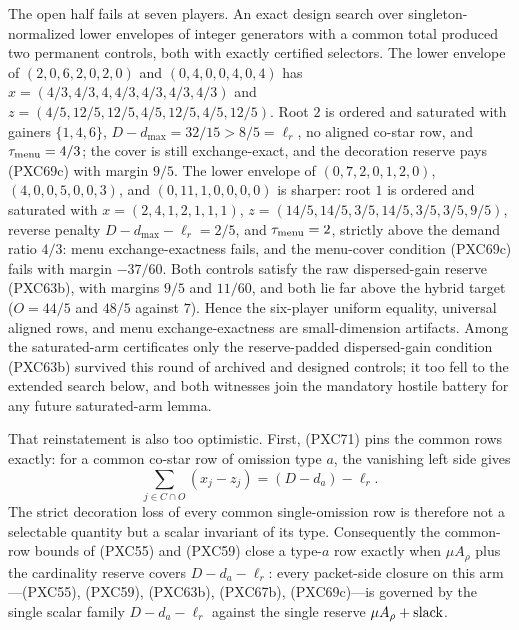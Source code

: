 \documentclass[11pt]{article}
\begin{document}
The open half fails at seven players.  An exact design search over
singleton-normalized lower envelopes of integer generators with a common
total produced two permanent controls, both with exactly certified
selectors.  The lower envelope of $(2,0,6,2,0,2,0)$ and $(0,4,0,0,4,0,4)$
has $x=(4/3,4/3,4,4/3,4/3,4/3,4/3)$ and
$z=(4/5,12/5,12/5,4/5,12/5,4/5,12/5)$.  Root $2$ is ordered and saturated
with gainers $\{1,4,6\}$, $D-d_{\max}=32/15>8/5=\ell_r$, no aligned
co-star row, and $\tau_{\rm menu}=4/3$; the cover is still
exchange-exact, and the decoration reserve pays (PXC69c) with margin
$9/5$.  The lower envelope of $(0,7,2,0,1,2,0)$, $(4,0,0,5,0,0,3)$, and
$(0,11,1,0,0,0,0)$ is sharper: root $1$ is ordered and saturated with
$x=(2,4,1,2,1,1,1)$, $z=(14/5,14/5,3/5,14/5,3/5,3/5,9/5)$, reverse
penalty $D-d_{\max}-\ell_r=2/5$, and $\tau_{\rm menu}=2$, strictly above
the demand ratio $4/3$: menu exchange-exactness fails, and the menu-cover
condition (PXC69c) fails with margin $-37/60$.  Both controls satisfy the
raw dispersed-gain reserve (PXC63b), with margins $9/5$ and $11/60$, and
both lie far above the hybrid target ($O=44/5$ and $48/5$ against $7$).
Hence the six-player uniform equality, universal aligned rows, and menu
exchange-exactness are small-dimension artifacts.  Among the
saturated-arm certificates only the reserve-padded dispersed-gain
condition (PXC63b) survived this round of archived and designed
controls; it too fell to the extended search below, and both witnesses
join the mandatory hostile battery for any future saturated-arm lemma.

That reinstatement is also too optimistic.  First, (PXC71) pins the common
rows exactly: for a common co-star row of omission type $a$, the vanishing
left side gives
\[
 \boxed{\qquad
 \sum_{j\in C\cap O}(x_j-z_j)=(D-d_a)-\ell_r.
 \qquad}                                             \tag{PXC72}
\]
The strict decoration loss of every common single-omission row is
therefore not a selectable quantity but a scalar invariant of its type.
Consequently the common-row bounds of (PXC55) and (PXC59) close a type-$a$
row exactly when $\mu A_\rho$ plus the cardinality reserve covers
$D-d_a-\ell_r$: every packet-side closure on this arm---(PXC55), (PXC59),
(PXC63b), (PXC67b), (PXC69c)---is governed by the single scalar family
$D-d_a-\ell_r$ against the single reserve $\mu A_\rho+{\rm slack}$.
\end{document}
